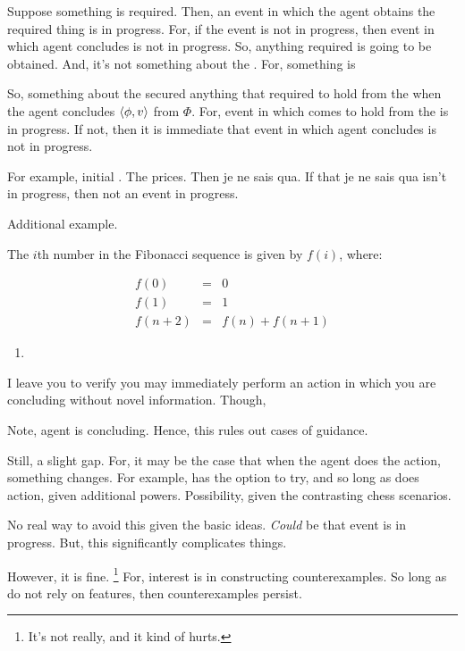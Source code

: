 \begin{note}
  Suppose something is required.
  Then, an event in which the agent obtains the required thing is in progress.
  For, if the event is not in progress, then event in which agent concludes is not in progress.
  So, anything required is going to be obtained.
  And, it's not something about the \agpe{}.
  For, something is


  So, something about the  secured anything that required to hold from the \agpe{} when the agent concludes \(\langle \phi, v \rangle\) from \(\Phi\).
  For, event in which comes to hold from the \agpe{} is in progress.
  If not, then it is immediate that event in which agent concludes is not in progress.

  For example, initial \fc{} \scen{}.
  The prices.
  Then je ne sais qua.
  If that je ne sais qua isn't in progress, then not an event in progress.
\end{note}

\begin{note}
  Additional example.
    \begin{scenario}%
    \label{scen:fc:fib}%
    The \(i\)th number in the Fibonacci sequence is given by \(f(i)\), where:

    \[
      \begin{array}{rcl}
        f(0) &=& 0 \\
        f(1) &=& 1 \\
        f(n + 2) &=& f(n) + f(n + 1)
      \end{array}
    \]
  \end{scenario}

  \begin{enumerate}[label=C\thescenarioCounter., ref=(C\thescenarioCounter)]
  \item
    \label{scen:fc:fib:c}
  \end{enumerate}
  I leave you to verify you may immediately perform an action in which you are concluding  without novel information.
  Though, 
\end{note}

\begin{note}
  Note, agent is concluding.
  Hence, this rules out cases of guidance.

  Still, a slight gap.
  For, it may be the case that when the agent does the action, something changes.
  For example, has the option to try, and so long as does action, given additional powers.
  Possibility, given the contrasting chess scenarios.

  No real way to avoid this given the basic ideas.
  \emph{Could} be that event is in progress.
  But, this significantly complicates things.

  However, it is fine.%
  \footnote{
    It's not really, and it kind of hurts.
  }
  For, interest is in constructing counterexamples.
  So long as do not rely on features, then counterexamples persist.
\end{note}

